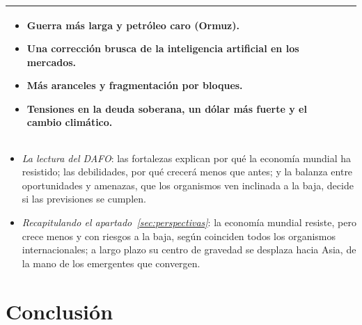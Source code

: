 \documentclass[11pt]{article}
\begin{document}
\begin{table}[H]
\begin{tabular}{>{\raggedright\arraybackslash}m{1.5cm}>{\raggedright\arraybackslash}m{6.45cm}>{\raggedright\arraybackslash}m{6.45cm}}
\begin{itemize}
\item Guerra más larga y petróleo caro (Ormuz).
\item Una corrección brusca de la inteligencia artificial en los mercados.
\item Más aranceles y fragmentación por bloques.
\item Tensiones en la deuda soberana, un dólar más fuerte y el cambio climático.
\end{itemize}\\
\bottomrule
\end{tabular}
\end{table}

\begin{itemize}
\item \emph{La lectura del DAFO}: las fortalezas explican por qué la economía mundial ha resistido; las debilidades, por qué crecerá menos que antes; y la balanza entre oportunidades y amenazas, que los organismos ven inclinada a la baja, decide si las previsiones se cumplen.
\item \emph{Recapitulando el apartado~\ref{sec:perspectivas}}: la economía mundial resiste, pero crece menos y con riesgos a la baja, según coinciden todos los organismos internacionales; a largo plazo su centro de gravedad se desplaza hacia Asia, de la mano de los emergentes que convergen.
\end{itemize}

\section*{Conclusión}
\end{document}
